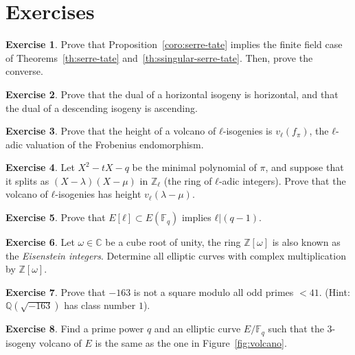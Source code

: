 \documentclass[10pt]{article}
\theoremstyle{plain}
\theoremstyle{definition}
\newtheorem{exercise}{Exercise}[part]
\def\F{\ensuremath{\mathbb{F}}}
\begin{document}
\section*{Exercises}

\begin{exercise}
  Prove that Proposition~\ref{coro:serre-tate} implies the finite
  field case of Theorems~\ref{th:serre-tate}
  and~\ref{th:ssingular-serre-tate}. %
  Then, prove the converse.
\end{exercise}

\begin{exercise}
  Prove that the dual of a horizontal isogeny is horizontal, and that
  the dual of a descending isogeny is ascending.
\end{exercise}

\begin{exercise}
  Prove that the height of a volcano of $ℓ$-isogenies is $v_ℓ(f_π)$,
  the $ℓ$-adic valuation of the Frobenius endomorphism.
\end{exercise}

\begin{exercise}
  Let $X^2-tX-q$ be the minimal polynomial of $π$, and suppose that it
  splits as $(X-λ)(X-μ)$ in $ℤ_ℓ$ (the ring of $ℓ$-adic integers). %
  Prove that the volcano of $ℓ$-isogenies has height $v_ℓ(λ-μ)$.
\end{exercise}

\begin{exercise}
  \label{ex:group-struct}
  Prove that $E[ℓ]⊂E(\F_q)$ implies $ℓ|(q-1)$.
\end{exercise}

\begin{exercise}
  Let $ω∈ℂ$ be a cube root of unity, the ring $ℤ[ω]$ is also known as
  the \emph{Eisenstein integers}. %
  Determine all elliptic curves with complex multiplication by $ℤ[ω]$.
\end{exercise}

\begin{exercise}
  Prove that $-163$ is not a square modulo all odd primes
  $<41$. (Hint: $ℚ(\sqrt{-163})$ has class number $1$).
\end{exercise}

\begin{exercise}
  Find a prime power $q$ and an elliptic curve $E/\F_q$ such that the
  $3$-isogeny volcano of $E$ is the same as the one in
  Figure~\ref{fig:volcano}.
\end{exercise}


\end{document}
